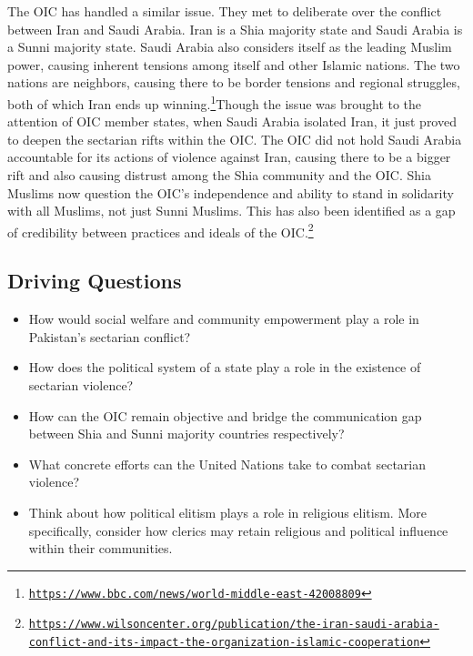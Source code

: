\documentclass[10pt, letterpaper]{article}
\begin{document}
The OIC has handled a similar issue. They met to deliberate over the
conflict between Iran and Saudi Arabia. Iran is a Shia majority state
and Saudi Arabia is a Sunni majority state. Saudi Arabia also considers
itself as the leading Muslim power, causing inherent tensions among
itself and other Islamic nations. The two nations are neighbors, causing
there to be border tensions and regional struggles, both of which Iran
ends up winning.\footnote{\texttt{\href{https://www.bbc.com/news/world-middle-east-42008809}{{https://www.bbc.com/news/world-middle-east-42008809}}}}Though
the issue was brought to the attention of OIC member states, when Saudi
Arabia isolated Iran, it just proved to deepen the sectarian rifts
within the OIC. The OIC did not hold Saudi Arabia accountable for its
actions of violence against Iran, causing there to be a bigger rift and
also causing distrust among the Shia community and the OIC. Shia Muslims
now question the OIC's independence and ability to stand in solidarity
with all Muslims, not just Sunni Muslims. This has also been identified
as a gap of credibility between practices and ideals of the
OIC.\footnote{\texttt{\href{https://www.wilsoncenter.org/publication/the-iran-saudi-arabia-conflict-and-its-impact-the-organization-islamic-cooperation}{{https://www.wilsoncenter.org/publication/the-iran-saudi-arabia-conflict-and-its-impact-the-organization-islamic-cooperation}}}} \\

\subsection{Driving Questions}

\begin{itemize}
\item
  
  How would social welfare and community empowerment play a role in
  Pakistan's sectarian conflict?
  
\item
  
  How does the political system of a state play a role in the existence
  of sectarian violence?
  
\item
  
  How can the OIC remain objective and bridge the communication gap
  between Shia and Sunni majority countries respectively?
  
\item
  
  What concrete efforts can the United Nations take to combat sectarian
  violence?
  
\item
  
  Think about how political elitism plays a role in religious elitism.
  More specifically, consider how clerics may retain religious and
  political influence within their communities.
  
\end{itemize}
\end{document}
